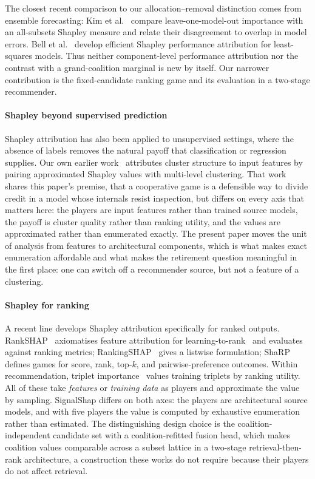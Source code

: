 \documentclass[pdflatex,sn-basic,Numbered]{sn-jnl}
\theoremstyle{plain}
\theoremstyle{definition}
\begin{document}
The closest recent comparison to our allocation--removal distinction comes
from ensemble forecasting: Kim et al.~\citep{kim2026forecast} compare
leave-one-model-out importance with an all-subsets Shapley measure and relate
their disagreement to overlap in model errors. Bell et al.~\citep{bell2024lsspa}
develop efficient Shapley performance attribution for least-squares models.
Thus neither component-level performance attribution nor the contrast with a
grand-coalition marginal is new by itself. Our narrower contribution is the
fixed-candidate ranking game and its evaluation in a two-stage recommender.

\paragraph{Shapley beyond supervised prediction}
Shapley attribution has also been applied to unsupervised settings, where the
absence of labels removes the natural payoff that classification or regression
supplies. Our own earlier work~\citep{louhichi2025gametheory} attributes
cluster structure to input features by pairing approximated Shapley values with
multi-level clustering. That work shares this paper's premise, that a cooperative game is a defensible way to divide credit in a model whose internals resist inspection, but differs on every axis that matters here: the players
are input features rather than trained source models, the payoff is cluster
quality rather than ranking utility, and the values are approximated rather
than enumerated exactly. The present paper moves the unit of analysis from
features to architectural components, which is what makes exact enumeration
affordable and what makes the retirement question meaningful in the first
place: one can switch off a recommender source, but not a feature of a
clustering.

\paragraph{Shapley for ranking}
A recent line develops Shapley attribution specifically for ranked outputs.
RankSHAP~\citep{chowdhury2025rankshap} axiomatises feature attribution for
learning-to-rank~\citep{burges2005learning} and evaluates against ranking metrics;
RankingSHAP~\citep{heuss2025rankingshap} gives a listwise formulation;
ShaRP~\citep{pliatsika2025sharp} defines games for score, rank, top-$k$, and
pairwise-preference outcomes. Within recommendation, triplet
importance~\citep{he2024triplet} values training triplets by ranking utility.
All of these take \emph{features} or \emph{training data} as players and
approximate the value by sampling. SignalShap differs on both axes: the players
are architectural source models, and with five players the value is computed by
exhaustive enumeration rather than estimated. The distinguishing design choice
is the coalition-independent candidate set with a coalition-refitted fusion
head, which makes coalition values comparable across a subset lattice in a
two-stage retrieval-then-rank architecture, a construction these works do not require because their players do not affect retrieval.
\end{document}
